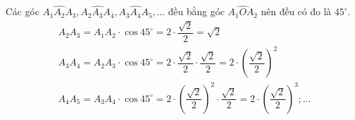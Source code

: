 \begin{ex}
{\begin{center}
		\end{center}
		Các góc $\widehat{A_1A_2A_3}, \widehat{A_2A_3A_4}, \widehat{A_3A_4A_5}, \ldots$ đều bằng góc $\widehat{A_1OA_2}$ nên đều có đo là $45^{\circ}$.
		$$
		\begin{aligned}
			& A_2 A_3=A_1 A_2 \cdot \cos 45^{\circ}=2 \cdot \dfrac{\sqrt{2}}{2}=\sqrt{2}\\
			& A_3 A_4=A_2 A_3 \cdot \cos 45^{\circ}=2 \cdot \dfrac{\sqrt{2}}{2} \cdot \dfrac{\sqrt{2}}{2}=2\cdot\left(\dfrac{\sqrt{2}}{2}\right)^2 \\
			& A_4 A_5=A_3 A_4 \cdot \cos 45^{\circ}=2 \cdot\left(\dfrac{\sqrt{2}}{2}\right)^2 \cdot \dfrac{\sqrt{2}}{2}=2 \cdot\left(\dfrac{\sqrt{2}}{2}\right)^3; \ldots
		\end{aligned}
		$$
	}
\end{ex}

